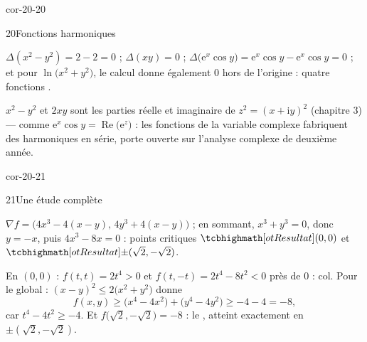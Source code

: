 \begin{blocLivre}{cor-20-20}
\begin{corrige}{20}{Fonctions harmoniques}
\begin{questions}
  \item $\Delta(x^{2}-y^{2})=2-2=0$ ; $\Delta(xy)=0$ ;
    $\Delta\bigl(\mathrm{e}^{x}\cos y\bigr)
    =\mathrm{e}^{x}\cos y-\mathrm{e}^{x}\cos y=0$ ; et pour
    $\ln\bigl(x^{2}+y^{2}\bigr)$, le calcul donne également $0$ hors de
    l'origine : quatre fonctions .
  \item $x^{2}-y^{2}$ et $2xy$ sont les parties réelle et imaginaire de
    $z^{2}=(x+\mathrm{i}y)^{2}$ (chapitre 3) — comme
    $\mathrm{e}^{x}\cos y=\operatorname{Re}\bigl(\mathrm{e}^{z}\bigr)$ :
    les fonctions de la variable complexe fabriquent des harmoniques en
    série, porte ouverte sur l'analyse complexe de deuxième année.
\end{questions}
\end{corrige}
\end{blocLivre}

\begin{blocLivre}{cor-20-21}
\begin{corrige}{21}{Une étude complète}
\begin{questions}
  \item $\nabla f=\bigl(4x^{3}-4(x-y),\,4y^{3}+4(x-y)\bigr)$ ; en
    sommant, $x^{3}+y^{3}=0$, donc $y=-x$, puis $4x^{3}-8x=0$ : points
    critiques $\res{(0,0)}$ et $\res{\pm(\sqrt2,-\sqrt2)}$.
  \item En $(0,0)$ : $f(t,t)=2t^{4}>0$ et
    $f(t,-t)=2t^{4}-8t^{2}<0$ près de $0$ : col. Pour le global :
    $(x-y)^{2}\leqslant2\bigl(x^{2}+y^{2}\bigr)$ donne
    \[
    f(x,y)\geqslant\bigl(x^{4}-4x^{2}\bigr)+\bigl(y^{4}-4y^{2}\bigr)
    \geqslant-4-4=-8 ,
    \]
    car $t^{4}-4t^{2}\geqslant-4$. Et $f\bigl(\sqrt2,-\sqrt2\bigr)=-8$ :
    le , atteint exactement en
    $\pm(\sqrt2,-\sqrt2)$.
\end{questions}
\end{corrige}
\end{blocLivre}

